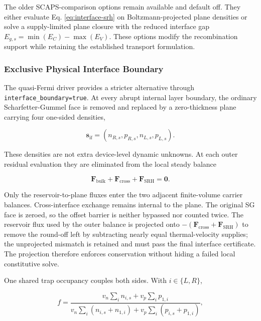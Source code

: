 \documentclass[
  11pt,
  american,
]{report}
\begin{document}
The older SCAPS-comparison options remain available and default off.
They either evaluate Eq. \ref{eq:interface-srh} on Boltzmann-projected
plane densities or solve a supply-limited plane closure with the reduced
interface gap \(E_{g,s} = \min(E_C)-\max(E_V)\). These options modify
the recombination support while retaining the established transport
formulation.

\hypertarget{exclusive-physical-interface-boundary}{%
\subsubsection{Exclusive Physical Interface
Boundary}\label{exclusive-physical-interface-boundary}}

The quasi-Fermi driver provides a stricter alternative through
\texttt{interface\_boundary=true}. At every abrupt internal layer
boundary, the ordinary Scharfetter-Gummel face is removed and replaced
by a zero-thickness plane carrying four one-sided densities,

\[
\mathbf{s}_{\mathrm{if}}=(n_{R,s},p_{R,s},n_{L,s},p_{L,s}).
\]

These densities are not extra device-level dynamic unknowns. At each
outer residual evaluation they are eliminated from the local steady
balance

\begin{equation}
\label{eq:physical-interface-qss}
\mathbf{F}_{\mathrm{bulk}}
+\mathbf{F}_{\mathrm{cross}}
+\mathbf{F}_{\mathrm{SRH}}=\mathbf{0}.
\end{equation}

Only the reservoir-to-plane fluxes enter the two adjacent finite-volume
carrier balances. Cross-interface exchange remains internal to the
plane. The original SG face is zeroed, so the offset barrier is neither
bypassed nor counted twice. The reservoir flux used by the outer balance
is projected onto
\(-(\mathbf{F}_{\mathrm{cross}}+\mathbf{F}_{\mathrm{SRH}})\) to remove
the round-off left by subtracting nearly equal thermal-velocity
supplies; the unprojected mismatch is retained and must pass the final
interface certificate. The projection therefore enforces conservation
without hiding a failed local constitutive solve.

One shared trap occupancy couples both sides. With \(i\in\{L,R\}\),

\begin{equation}
\label{eq:shared-interface-occupancy}
f=\frac{v_n\sum_i n_{i,s}+v_p\sum_i p_{1,i}}
{v_n\sum_i(n_{i,s}+n_{1,i})+v_p\sum_i(p_{i,s}+p_{1,i})},
\end{equation}
\end{document}

